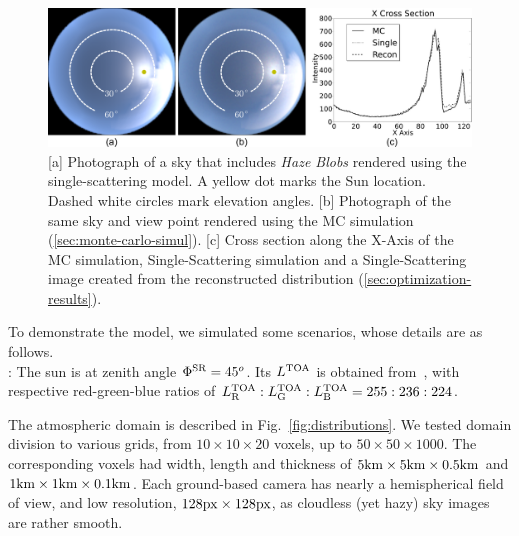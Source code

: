 \documentclass[10pt,letterpaper]{article}
\newcommand{\yoavcomment}[1]{}
\renewcommand{\yoavcomment}[1]{#1} %
\begin{document}
\begin{figure}
  \centering
  \yoavcomment{\includegraphics[width=\linewidth]{images/ref_images.pdf}}
  \caption{\small [a] Photograph of a sky that includes {\em Haze
      Blobs} rendered using the single-scattering model.  A yellow dot
    marks the Sun location. Dashed white circles mark elevation
    angles.  [b] Photograph of the same sky and view point rendered
    using the MC simulation (\cref{sec:monte-carlo-simul}).  [c] Cross
    section along the X-Axis of the MC simulation, Single-Scattering
    simulation and a Single-Scattering image created from the
    reconstructed distribution (\cref{sec:optimization-results}).}
  \label{fig:simulation-results1}
\end{figure}
To demonstrate the model, we simulated some scenarios, whose details are as follows.\\
: The sun is at zenith angle $\Phi^{\rm
  SR}=45^o$.  Its $L^{\rm TOA}$ is obtained
from~\cite{BBradiance,sun_composition}, with respective red-green-blue
ratios of $L^{\rm TOA}_{\rm R}:L^{\rm TOA}_{\rm G}:L^{\rm TOA}_{\rm
  B}=255:236:224$.

The atmospheric domain is described in Fig.~\ref{fig:distributions}.
We tested domain division to various grids, from $10\times10 \times
20$ voxels, up to $50\times50 \times 1000$. The corresponding voxels
had width, length and thickness of $5{\rm km}\times 5{\rm km} \times
0.5{\rm km}$ and $1{\rm km}\times 1{\rm km} \times 0.1{\rm km}$.  Each
ground-based camera has nearly a hemispherical field of view, and low
resolution, $128 \rm{px} \times 128 \rm{px}$, as cloudless (yet hazy)
sky images are rather smooth.
\end{document}
